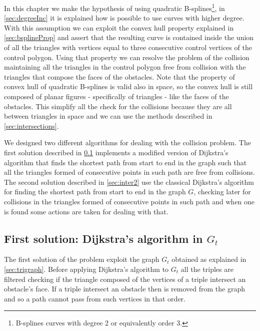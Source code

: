 \documentclass[dissertation.tex]{subfiles}
\begin{document}
In this chapter we make the hypothesis of using
quadratic B-splines\footnote{B-splines curves with degree 2 or equivalently order 3.}, in
\cref{sec:degreeInc} it is explained how is possible to use curves with
higher degree. With this assumption we can exploit the convex hull
property explained in \cref{sec:bsplineProp} and assert that the
resulting curve is contained inside the union of all the triangles
with vertices equal to three consecutive control vertices of the control
polygon. Using that property we can resolve the problem of the
collision maintaining all the triangles in the control polygon free
from collision with the triangles that compose the faces of the
obstacles. Note that the property of convex hull of quadratic
B-splines is valid also in space, so the convex hull is still composed
of planar figures - specifically of triangles - like the faces of the
obstacles. This simplify all the check for the collisions because they
are all between triangles in space and we can use the methods
described in \cref{sec:intersections}.

We designed two different algorithms for dealing with the collision
problem. The first solution described in \cref{sec:inter1} implements
a modified version of Dijkstra's
algorithm that finds the shortest path from start to end in the graph
such that all the triangles formed of consecutive points in such path
are free from collisions. The second solution described in
\cref{sec:inter2} use the classical Dijkstra's algorithm for finding
the shortest path from start to end in the graph $G$, checking later for
collisions in the triangles formed of consecutive points in such path
and when one is found some actions are taken for dealing with that.

\subsection{First solution: Dijkstra's algorithm in $G_t$}\label{sec:inter1}
The first solution of the problem exploit the graph $G_t$ obtained as
explained in \cref{sec:trigraph}. Before applying Dijkstra's algorithm
to $G_t$ all the triples are filtered checking if the
triangle composed of the vertices of a triple intersect an obstacle's
face. If a triple intersect an obstacle then is removed from the graph
and so a path cannot pass from such vertices in that order.
\end{document}
